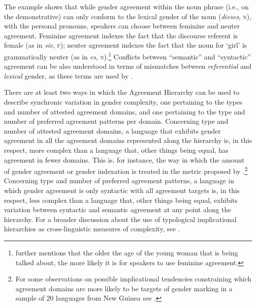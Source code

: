 \documentclass[output=collectionpaper]{langsci/langscibook}
\begin{document}
The example shows that while gender agreement within the noun phrase (i.e., on the demonstrative) can only conform to the lexical gender of the noun (\textit{dieses}, \textsc{n}), with the personal pronouns, speakers can choose between feminine and neuter agreement. Feminine agreement indexes the fact that the discourse referent is female (as in \textit{sie}, \textsc{f}); neuter agreement indexes the fact that the noun for `girl' is grammatically neuter (as in \textit{es}, \textsc{n}).\footnote{\citealt[228]{Corbett1991} further mentions that the older the age of the young woman that is being talked about, the more likely it is for speakers to use feminine agreement.}  Conflicts between ``semantic'' and ``syntactic'' agreement can be also understood in terms of mismatches between \textit{referential} and \textit{lexical} gender, as these terms are used by \citet{Dahl2000a} \citep[see also the study of the evolution of gender marking in medieval English by][]{Siemund2011}.

There are at least two ways in which the Agreement Hierarchy can be used to describe synchronic variation in gender complexity, one pertaining to the types and number of attested agreement domains, and one pertaining to the type and number of preferred agreement patterns per domain. Concerning type and number of attested agreement domains, a language that exhibits gender agreement in all the agreement domains represented along the hierarchy is, in this respect, more complex than a language that, other things being equal, has agreement in fewer domains. This is, for instance, the way in which the amount of gender agreement or gender indexation is treated in the metric proposed by \citet{DiGarbo2016}.\footnote{For some observations on possible  implicational tendencies constraining which agreement domains are more likely to be targets of gender marking in a sample of 20 languages from New Guinea see .} Concerning type and number of preferred agreement patterns, a language in which gender agreement is only syntactic with all agreement targets is, in this respect, less complex than a language that, other things being equal, exhibits variation between syntactic and semantic agreement at any point along the hierarchy. For a broader discussion about the use of typological implicational hierarchies as cross-linguistic measures of complexity, see \citet{Miestamo2009}.
\end{document}
